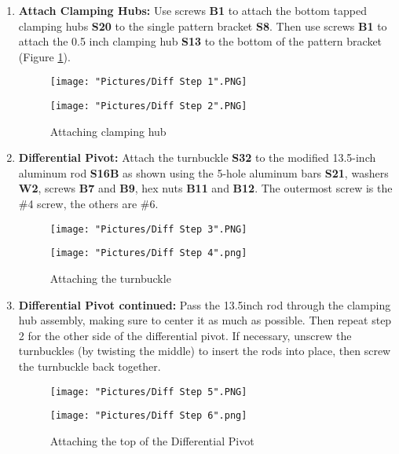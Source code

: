 \documentclass[12pt]{article}
\begin{document}
\begin{enumerate}
\item \textbf{Attach Clamping Hubs:} Use screws \textbf{B1} to attach the bottom tapped clamping hubs \textbf{S20} to the single pattern bracket \textbf{S8}. Then use screws \textbf{B1} to attach the 0.5 inch clamping hub \textbf{S13} to the bottom of the pattern bracket (Figure \ref{attaching clamping hub}).

\begin{figure}[H]
  \centering
  \begin{minipage}[b]{0.45\textwidth}
    \texttt{[image: "Pictures/Diff Step 1".PNG]}
  \end{minipage}
  \hfill
  \begin{minipage}[b]{0.45\textwidth}
    \texttt{[image: "Pictures/Diff Step 2".PNG]}
  \end{minipage}
  \caption{Attaching clamping hub}
  \label{attaching clamping hub}
\end{figure}

\item \textbf{Differential Pivot:} Attach the turnbuckle \textbf{S32} to the modified 13.5-inch aluminum rod \textbf{S16B} as shown using the 5-hole aluminum bars \textbf{S21}, washers \textbf{W2}, screws \textbf{B7} and \textbf{B9}, hex nuts \textbf{B11} and \textbf{B12}. The outermost screw is the \#4 screw, the others are \#6.

\begin{figure}[H]
  \centering
  \begin{minipage}[b]{0.45\textwidth}
    \texttt{[image: "Pictures/Diff Step 3".PNG]}
  \end{minipage}
  \hfill
  \begin{minipage}[b]{0.45\textwidth}
    \texttt{[image: "Pictures/Diff Step 4".png]}
  \end{minipage}
  \caption{Attaching the turnbuckle}
\end{figure}

\item \textbf{Differential Pivot continued:} Pass the 13.5inch rod through the clamping hub assembly, making sure to center it as much as possible. Then repeat step 2 for the other side of the differential pivot. If necessary, unscrew the turnbuckles (by twisting the middle) to insert the rods into place, then screw the turnbuckle back together.

\begin{figure}[H]
  \centering
  \begin{minipage}[b]{0.45\textwidth}
    \texttt{[image: "Pictures/Diff Step 5".PNG]}
  \end{minipage}
  \hfill
  \begin{minipage}[b]{0.45\textwidth}
    \texttt{[image: "Pictures/Diff Step 6".png]}
  \end{minipage}
  \caption{Attaching the top of the Differential Pivot}
\end{figure}


\end{enumerate}
\end{document}

